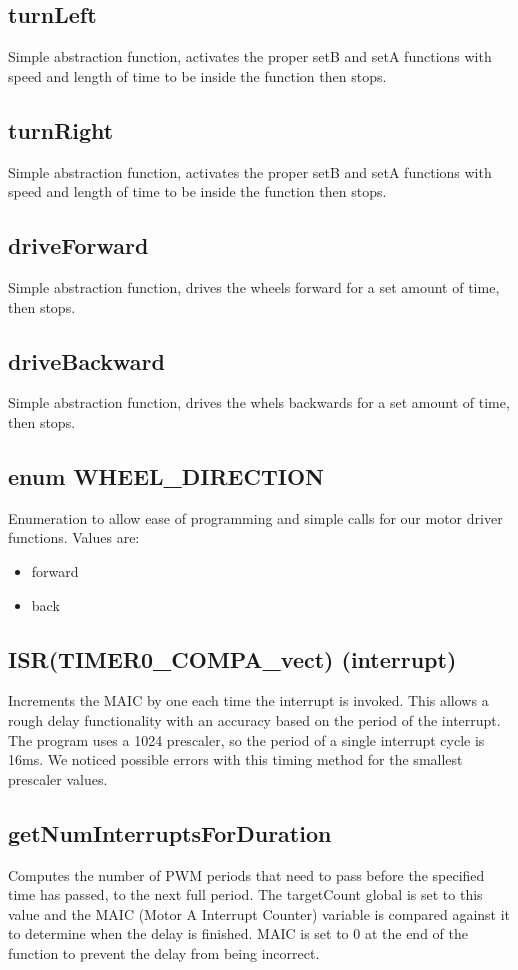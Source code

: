 \documentclass[letterpaper,11pt]{texMemo} %
\begin{document}
\subsection*{turnLeft}
Simple abstraction function, activates the proper setB and setA functions 
with speed and length of time to be inside the function then stops.

\subsection*{turnRight}
Simple abstraction function, activates the proper setB and setA functions 
with speed and length of time to be inside the function then stops.

\subsection*{driveForward}
Simple abstraction function, drives the wheels forward for a set amount 
of time, then stops.

\subsection*{driveBackward}
Simple abstraction function, drives the whels backwards for a set amount
of time, then stops.

\subsection*{enum WHEEL\_DIRECTION}
Enumeration to allow ease of programming and simple calls for our motor driver
functions. Values are: 

\begin{itemize}
    \item forward
    \item back
\end{itemize}

\subsection*{ISR(TIMER0\_COMPA\_vect) (interrupt)}
Increments the MAIC by one each time the interrupt is invoked. This allows a rough delay functionality with an accuracy based on the period of the interrupt. The program uses a 1024 prescaler, so the period of a single interrupt cycle is 16ms. We noticed possible errors with this timing method for the smallest prescaler values.

\subsection*{getNumInterruptsForDuration}
Computes the number of PWM periods that need to pass before the specified time has passed, to the next full period. The targetCount global is set to this value and the MAIC (Motor A Interrupt Counter) variable is compared against it to determine when the delay is finished. MAIC is set to 0 at the end of the function to prevent the delay from being incorrect.
\end{document}
